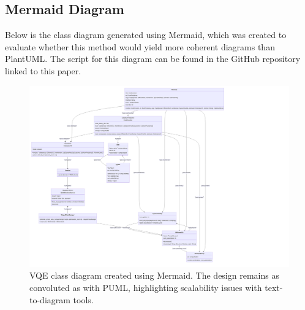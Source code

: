 \documentclass{article}
\begin{document}
\subsection{Mermaid Diagram}

Below is the class diagram generated using Mermaid, which was created to evaluate whether this method would yield more coherent diagrams than PlantUML. The script for this diagram can be found in the GitHub repository linked to this paper\cite{ellygithub}.

\begin{figure}[H]
    \centering
    \includegraphics[width=1\linewidth]{mermaidClassDiagram.png}
    \caption{VQE class diagram created using Mermaid. The design remains as convoluted as with PUML, highlighting scalability issues with text-to-diagram tools.}
    \label{fig:mermaidClassDiagram}
\end{figure}
\end{document}
